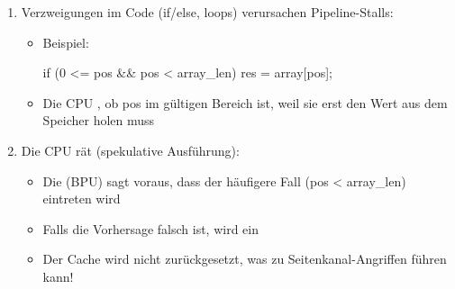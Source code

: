 \begin{infoBox}[title=Wie funktioniert Branch Prediction?]
    \begin{enumerate}
        \item Verzweigungen im Code (if/else, loops) verursachen Pipeline-Stalls:
        \begin{itemize}
            \item Beispiel:
            \begin{codeBlock}{}
                if (0 <= pos && pos < array_len){
                    res = array[pos];
                }
            \end{codeBlock}
            \item Die CPU , ob pos im gültigen Bereich ist, weil sie erst den Wert aus dem Speicher holen muss
        \end{itemize}
        \item Die CPU rät (spekulative Ausführung):
        \begin{itemize}
            \item Die  (BPU) sagt voraus, dass der häufigere Fall (pos < array\_len) eintreten wird
            \item Falls die Vorhersage falsch ist, wird ein 
            \item {} Der Cache wird nicht zurückgesetzt, was zu Seitenkanal-Angriffen führen kann!
        \end{itemize}
    \end{enumerate}
\end{infoBox}

